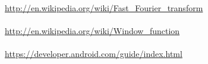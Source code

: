 \noindent \url{http://en.wikipedia.org/wiki/Fast_Fourier_transform}\\
\\
\url{http://en.wikipedia.org/wiki/Window_function}\\
\\
\url{https://developer.android.com/guide/index.html}\\
